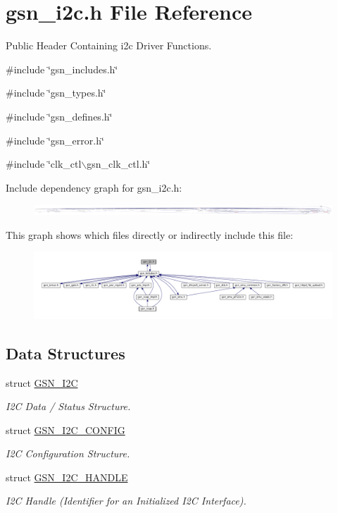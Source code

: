 \hypertarget{a00516}{
\section{gsn\_\-i2c.h File Reference}
\label{a00516}
}


Public Header Containing i2c Driver Functions.  


{\ttfamily \#include \char`\"{}gsn\_\-includes.h\char`\"{}}\par
{\ttfamily \#include \char`\"{}gsn\_\-types.h\char`\"{}}\par
{\ttfamily \#include \char`\"{}gsn\_\-defines.h\char`\"{}}\par
{\ttfamily \#include \char`\"{}gsn\_\-error.h\char`\"{}}\par
{\ttfamily \#include \char`\"{}clk\_\-ctl$\backslash$gsn\_\-clk\_\-ctl.h\char`\"{}}\par
Include dependency graph for gsn\_\-i2c.h:
\nopagebreak
\begin{figure}[H]
\begin{center}
\leavevmode
\includegraphics[width=400pt]{a00749}
\end{center}
\end{figure}
This graph shows which files directly or indirectly include this file:
\nopagebreak
\begin{figure}[H]
\begin{center}
\leavevmode
\includegraphics[width=400pt]{a00750}
\end{center}
\end{figure}
\subsection*{Data Structures}
\begin{DoxyCompactItemize}
\item 
struct \hyperlink{a00098}{GSN\_\-I2C}
\begin{DoxyCompactList}\small\item\em I2C Data / Status Structure. \end{DoxyCompactList}\item 
struct \hyperlink{a00099}{GSN\_\-I2C\_\-CONFIG}
\begin{DoxyCompactList}\small\item\em I2C Configuration Structure. \end{DoxyCompactList}\item 
struct \hyperlink{a00100}{GSN\_\-I2C\_\-HANDLE}
\begin{DoxyCompactList}\small\item\em I2C Handle (Identifier for an Initialized I2C Interface). \end{DoxyCompactList}\end{DoxyCompactItemize}
